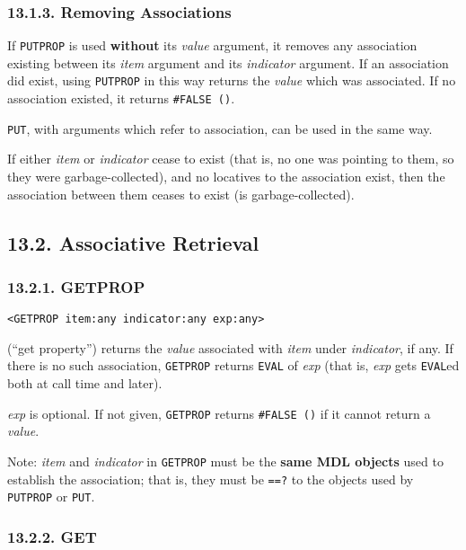 \documentclass[a4paper,]{article}
\begin{document}
\subsubsection{13.1.3. Removing Associations}\label{removing-associations}

If \texttt{PUTPROP} is used \textbf{without} its \emph{value} argument, it removes any association existing between its
\emph{item} argument and its \emph{indicator} argument. If an association did exist, using \texttt{PUTPROP} in this way
returns the \emph{value} which was associated. If no association existed, it returns \texttt{\#FALSE\ ()}.

\texttt{PUT}, with arguments which refer to association, can be used in the same way.

If either \emph{item} or \emph{indicator} cease to exist (that is, no one was pointing to them, so they were
garbage-collected), and no locatives to the association exist, then the association between them ceases to exist (is
garbage-collected).

\subsection{13.2. Associative Retrieval}\label{associative-retrieval}

\subsubsection{13.2.1. GETPROP}\label{getprop}

\begin{verbatim}
<GETPROP item:any indicator:any exp:any>
\end{verbatim}

 (``get property'') returns the \emph{value} associated with \emph{item} under
\emph{indicator}, if any. If there is no such association, \texttt{GETPROP} returns \texttt{EVAL} of \emph{exp} (that is,
\emph{exp} gets \texttt{EVAL}ed both at call time and later).

\emph{exp} is optional. If not given, \texttt{GETPROP} returns \texttt{\#FALSE\ ()} if it cannot return a \emph{value}.

Note: \emph{item} and \emph{indicator} in \texttt{GETPROP} must be the \textbf{same MDL objects} used to establish the
association; that is, they must be \texttt{==?} to the objects used by \texttt{PUTPROP} or \texttt{PUT}.

\subsubsection{13.2.2. GET}\label{get-1}
\end{document}
